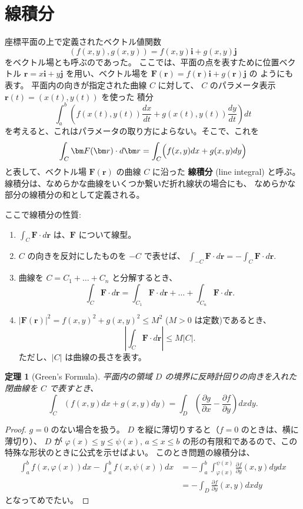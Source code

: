 \documentclass[a4paper]{jsarticle}
\newtheorem{Theorem}{定理}[section]
\theoremstyle{definition}
\theoremstyle{remark}
\newcommand{\del}{\partial}
\begin{document}
\section{線積分}

座標平面の上で定義されたベクトル値関数
\[
(f(x,y), g(x,y)) = f(x,y) {\bm i} + g(x,y) {\bm j} 
\]
をベクトル場とも呼ぶのであった。
ここでは、平面の点を表すために位置ベクトル ${\bm r} = x{\bm i} + y{\bm j}$ 
を用い、ベクトル場を ${\bm F}({\bm r}) = f({\bm r}){\bm i} + g({\bm r}){\bm j}$ の
ようにも表す。
平面内の向きが指定された曲線 $C$ に対して、
$C$ のパラメータ表示 ${\bm r}(t) = (x(t),y(t))$ を使った
積分
\[
\int_a^b 
\left( 
f(x(t),y(t)) \frac{dx}{dt} + g(x(t),y(t)) \frac{dy}{dt} 
\right)dt
\]
を考えると、これはパラメータの取り方によらない。そこで、これを
\[
\int_C {\bm F}({\bm r})\cdot d{\bm r} = \int_C \Bigl(f(x,y)dx + g(x,y)dy \Bigr) 
\]
と表して、ベクトル場 ${\bm F}({\bm r})$ の曲線 $C$ に沿った
{\bf 線積分} (line integral) と呼ぶ。線積分は、なめらかな曲線をいくつか繋いだ折れ線状の場合にも、
なめらかな部分の線積分の和として定義される。

ここで線積分の性質:
\begin{enumerate}
\item 
$\int_C {\bm F}\cdot d{\bm r}$ は、${\bm F}$ について線型。
\item 
$C$ の向きを反対にしたものを $-C$ で表せば、
$\int_{-C} {\bm F}\cdot d{\bm r} = - \int_C {\bm F}\cdot d{\bm r}$. 
\item 
曲線を $C = C_1 + \dots + C_n$ と分解するとき、
\[
\int_C {\bm F}\cdot d{\bm r} = \int_{C_1} {\bm F}\cdot d{\bm r} + \dots + \int_{C_n} {\bm F}\cdot d{\bm r}. 
\]
\item 
$|{\bm F}({\bm r})|^2 = f(x,y)^2 + g(x,y)^2 \leq M^2$ ($M>0$ は定数)であるとき、
\[
\left| \int_C {\bm F}\cdot d{\bm r} \right| \leq M |C|. 
\]
ただし、$|C|$ は曲線の長さを表す。
\end{enumerate}

\begin{Theorem}[Green's Formula]
平面内の領域 $D$ の境界に反時計回りの向きを入れた閉曲線を $C$ で表すとき、
\[
\int_C (f(x,y) dx + g(x,y)dy) = 
\int_D \left( \frac{\del g}{\del x} - \frac{\del f}{\del y} 
\right) dxdy.
\]
\end{Theorem}

\begin{proof}
$g = 0$ のない場合を扱う。
$D$ を縦に薄切りすると（$f = 0$ のときは、横に薄切り）、
$D$ が $\varphi(x) \leq y \leq \psi(x)$, $a \leq x \leq b$ 
の形の有限和であるので、この特殊な形状のときに公式を示せばよい。
このとき問題の線積分は、
\begin{align*}
\int_a^b f(x,\varphi(x))dx - \int_a^b f(x,\psi(x))dx 
&= -\int_a^b \int_{\varphi(x)}^{\psi(x)} 
\frac{\del f}{\del y}(x,y) dy dx\\
&= - \int_D \frac{\del f}{\del y}(x,y) dxdy 
\end{align*}
となってめでたい。
\end{proof}
\end{document}
